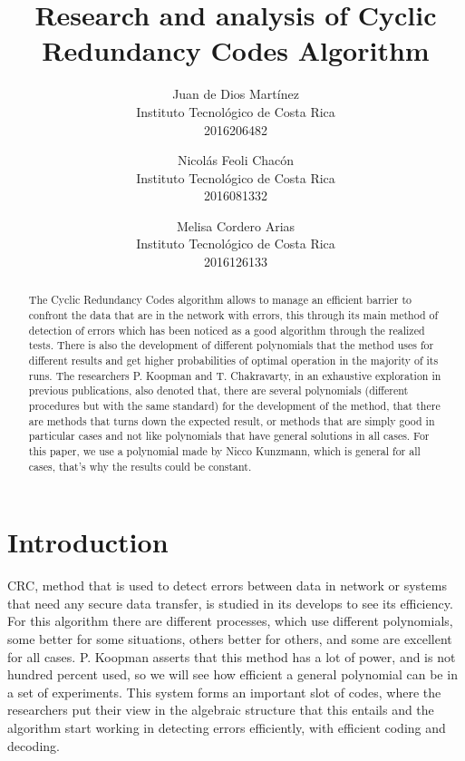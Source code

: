 \documentclass[10pt,twocolumn,letterpaper]{article}
\begin{document}
\title{Research and analysis of Cyclic Redundancy Codes Algorithm}

\author{Juan de Dios Mart\'inez \\
Instituto Tecnol\'ogico de Costa Rica\\
2016206482\\
\and
Nicol\'as Feoli Chac\'on\\
Instituto Tecnol\'ogico de Costa Rica\\
2016081332\\
\and
Melisa Cordero Arias\\
Instituto Tecnol\'ogico de Costa Rica\\
2016126133\\
}

\maketitle

\begin{abstract}
The Cyclic Redundancy Codes algorithm allows to manage an efficient barrier to confront the data that are in the network with errors, this through its main method of detection of errors which has been noticed as a good algorithm through the realized tests. There is also the development of different polynomials that the method uses for different results and get higher probabilities of optimal operation in the majority of its runs.
The researchers P. Koopman and T. Chakravarty, in an exhaustive exploration in previous publications, also denoted that, there are several polynomials (different procedures but with the same standard) for the development of the method, that there are methods that turns down the expected result, or methods that are simply good in particular cases and not like polynomials that have general solutions in all cases.
For this paper, we use a polynomial made by Nicco Kunzmann, which is general for all cases, that’s why the results could be constant.
\end{abstract}
\section{Introduction}
CRC, method that is used to detect errors between data in network or systems that need any secure data transfer, is studied in its develops to see its efficiency. For this algorithm there are different processes, which use different polynomials, some better for some situations, others better for others, and some are excellent for all cases. P. Koopman asserts that this method has a lot of power, and is not hundred percent used, so we will see how efficient a general polynomial can be in a set of experiments.
This system forms an important slot of codes, where the researchers put their view in the algebraic structure that this entails and the algorithm start working in detecting errors efficiently, with efficient coding and decoding.
\end{document}
